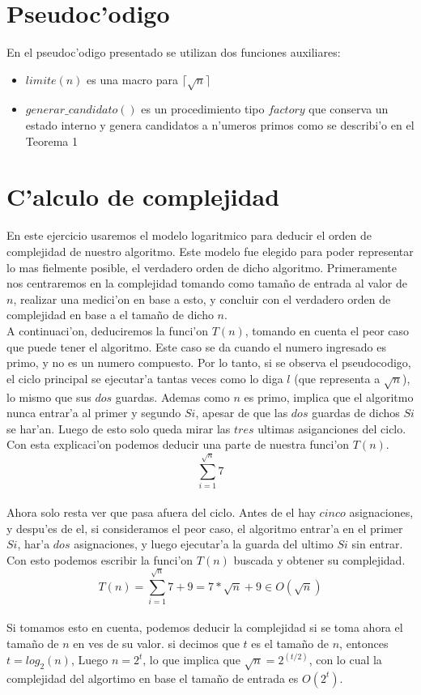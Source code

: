 \section{Pseudoc'odigo}


En el pseudoc'odigo presentado se utilizan dos funciones auxiliares:
\begin{itemize}
\item $limite(n)$ es una macro para $\lceil\sqrt{n}\rceil$
\item $generar\_candidato()$ es un procedimiento tipo $factory$ que conserva un estado interno 
y genera candidatos a n'umeros primos como se describi'o en el Teorema 1
\end{itemize}

\section{C'alculo de complejidad}
En este ejercicio usaremos el modelo logaritmico para deducir el orden de complejidad de nuestro algoritmo. Este modelo fue elegido para poder representar lo mas fielmente posible, el verdadero orden de dicho algoritmo. Primeramente nos centraremos en la complejidad tomando como tama\~{n}o de entrada al valor de $n$, realizar una medici'on en base a esto, y concluir con el verdadero orden de complejidad en base a el tama\~{n}o de dicho $n$.\\
A continuaci'on, deduciremos la funci'on $T(n)$, tomando en cuenta el peor caso que puede tener el algoritmo. Este caso se da cuando el numero ingresado es primo, y no es un numero compuesto. Por lo tanto, si se observa el pseudocodigo, el ciclo principal se ejecutar'a tantas veces como lo diga $l$ (que representa a $\sqrt{n}$), lo mismo que sus $dos$ guardas. Ademas como $n$ es primo, implica que el algoritmo nunca entrar'a al primer y segundo $Si$, apesar de que las $dos$ guardas de dichos $Si$ se har'an. Luego de esto solo queda mirar las $tres$ ultimas asiganciones del ciclo. Con esta explicaci'on podemos deducir una parte de nuestra funci'on $T(n)$.
$$\sum_{i=1}^{\sqrt{n}}7$$\\
Ahora solo resta ver que pasa afuera del ciclo. Antes de el hay $cinco$ asignaciones, y despu'es de el, si consideramos el peor caso, el algoritmo entrar'a en el primer $Si$, har'a $dos$ asignaciones, y luego ejecutar'a la guarda del ultimo $Si$ sin entrar. Con esto podemos escribir la funci'on $T(n)$ buscada y obtener su complejidad.\\
$$T(n) = \sum_{i=1}^{\sqrt{n}}7 + 9 = 7*\sqrt{n} + 9 \in O(\sqrt{n})$$\\
Si tomamos esto en cuenta, podemos deducir la complejidad si se toma ahora el tama\~{n}o de $n$ en ves de su valor. si decimos que $t$ es el tama\~{n}o de $n$, entonces $t = log_2(n)$, Luego $n = 2^t$, lo que implica que $\sqrt{n} = 2^{(t/2)}$, con lo cual la complejidad del algortimo en base el tama\~{n}o de entrada es $O(2^t)$.


